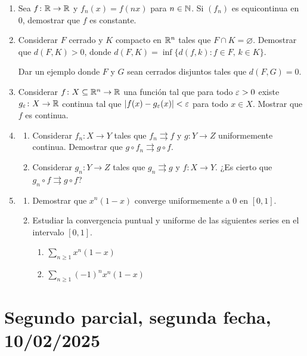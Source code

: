 \begin{enumerate}[label=(\arabic*)]
  \item Sea \(f\colon \mathbb{R} \to \mathbb{R}\) y \(f_n(x) = f(nx)\) para \(n \in \mathbb{N}\). Si \({(f_n)}\) es equicontinua en \(0\), demostrar que \(f\) es constante.
  \item Considerar \(F\) cerrado y \(K\) compacto en \(\mathbb{R}^n\) tales que \(F \cap K = \varnothing\). Demostrar que \(d(F, K) > 0\), donde \(d(F, K) = \inf\{ d(f, k) : f \in F, \, k \in K \}\).

        Dar un ejemplo donde \(F\) y \(G\) sean cerrados disjuntos tales que \(d(F, G) = 0\).
  \item Considerar \(f\colon X \subseteq \mathbb{R}^n \to \mathbb{R}\) una función tal que para todo \(\varepsilon > 0\) existe \(g_{\varepsilon}\colon X \to \mathbb{R}\) continua tal que \(|f(x) - g_{\varepsilon}(x)| < \varepsilon\) para todo \(x \in X\). Mostrar que \(f\) es continua.
  \item \begin{enumerate}[label=(\alph*)]
          \item Considerar \(f_n\colon X \to Y\) tales que \(f_n \rightrightarrows f\) y \(g\colon Y \to Z\) uniformemente continua. Demostrar que \(g \circ f_n \rightrightarrows g \circ f\).
          \item Considerar \(g_n\colon Y \to Z\) tales que \(g_n \rightrightarrows g\) y \(f\colon X \to Y\). ¿Es cierto que \(g_n \circ f \rightrightarrows g \circ f\)?
        \end{enumerate}
  \item \begin{enumerate}[label=(\alph*)]
          \item Demostrar que \(x^n (1 - x)\) converge uniformemente a \(0\) en \([0, 1]\).
          \item Estudiar la convergencia puntual y uniforme de las siguientes series en el intervalo \([0, 1]\).
                \begin{enumerate}[label=(\roman*)]
                  \item \(\sum_{n \geq 1} x^n (1 - x)\)
                  \item \(\sum_{n \geq 1} {(-1)}^n x^n (1 - x)\)
                \end{enumerate}
        \end{enumerate}
\end{enumerate}

\clearpage

\section{Segundo parcial, segunda fecha, 10/02/2025}


